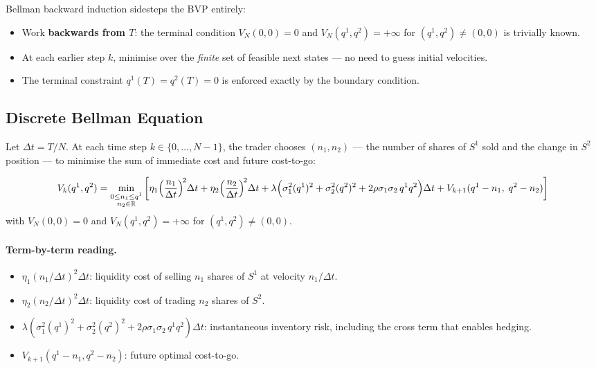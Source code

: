 \documentclass[12pt, a4paper]{article}
\begin{document}
Bellman backward induction sidesteps the BVP entirely:
\begin{itemize}[leftmargin=1.5em]
  \item Work \textbf{backwards from $T$}: the terminal condition
        $V_N(0,0) = 0$ and $V_N(q^1,q^2) = +\infty$ for
        $(q^1,q^2) \neq (0,0)$ is trivially known.
  \item At each earlier step $k$, minimise over the \emph{finite} set of
        feasible next states — no need to guess initial velocities.
  \item The terminal constraint $q^1(T) = q^2(T) = 0$ is enforced
        exactly by the boundary condition.
\end{itemize}

\subsection{Discrete Bellman Equation}

Let $\Delta t = T/N$. At each time step $k \in \{0,\ldots,N-1\}$, the trader
chooses $(n_1, n_2)$ — the number of shares of $S^1$ sold and the change in
$S^2$ position — to minimise the sum of immediate cost and future cost-to-go:

\begin{resultbox}
\[
  V_k(q^1, q^2)
  = \min_{\substack{0 \le n_1 \le q^1 \\ n_2 \in \mathbb{R}}}
  \left[
    \eta_1\!\left(\frac{n_1}{\Delta t}\right)^{\!2}\!\Delta t
    + \eta_2\!\left(\frac{n_2}{\Delta t}\right)^{\!2}\!\Delta t
    + \lambda\Bigl(\sigma_1^2 (q^1)^2 + \sigma_2^2 (q^2)^2
                   + 2\rho\sigma_1\sigma_2\,q^1 q^2\Bigr)\Delta t
    + V_{k+1}(q^1 - n_1,\; q^2 - n_2)
  \right]
\]
with $V_N(0,0) = 0$ and $V_N(q^1,q^2) = +\infty$ for $(q^1,q^2)\neq(0,0)$.
\end{resultbox}

\paragraph{Term-by-term reading.}
\begin{itemize}[leftmargin=1.5em]
  \item $\eta_1(n_1/\Delta t)^2\Delta t$: liquidity cost of selling $n_1$ shares
        of $S^1$ at velocity $n_1/\Delta t$.
  \item $\eta_2(n_2/\Delta t)^2\Delta t$: liquidity cost of trading $n_2$ shares
        of $S^2$.
  \item $\lambda(\sigma_1^2(q^1)^2 + \sigma_2^2(q^2)^2 +
        2\rho\sigma_1\sigma_2\,q^1 q^2)\Delta t$: instantaneous inventory risk,
        including the cross term that enables hedging.
  \item $V_{k+1}(q^1-n_1, q^2-n_2)$: future optimal cost-to-go.
\end{itemize}
\end{document}
